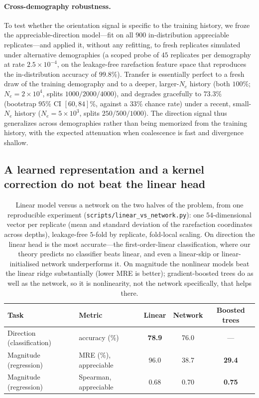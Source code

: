 \documentclass[11pt]{article}
\theoremstyle{plain}
\theoremstyle{definition}
\theoremstyle{remark}
\begin{document}
\paragraph{Cross-demography robustness.} To test whether the orientation signal is specific to the training
history, we froze the appreciable-direction model---fit on all $900$ in-distribution appreciable
replicates---and applied it, without any refitting, to fresh replicates simulated under alternative
demographies (a scoped probe of $45$ replicates per demography at rate $2.5\times10^{-4}$, on the
leakage-free rarefaction feature space that reproduces the in-distribution accuracy of $99.8\%$). Transfer is
essentially perfect to a fresh draw of the training demography and to a deeper, larger-$N_e$ history (both
$100\%$; $N_e=2\times10^{4}$, splits $1000/2000/4000$), and degrades gracefully to $73.3\%$ (bootstrap $95\%$
CI $[60,84]\%$, against a $33\%$ chance rate) under a recent, small-$N_e$ history ($N_e=5\times10^{3}$, splits
$250/500/1000$). The direction signal thus generalizes across demographies rather than being memorized from
the training history, with the expected attenuation when coalescence is fast and divergence shallow.

\subsection{A learned representation and a kernel correction do not beat the linear head}
\label{subsec:deep-kernel}

\begin{table}[b]
\centering
\begin{tabular}{llccc}
\toprule
Task & Metric & Linear & Network & Boosted trees \\
\midrule
Direction (classification) & accuracy (\%) & \textbf{78.9} & 76.0 & --- \\
Magnitude (regression) & MRE (\%), appreciable & 96.0 & 38.7 & \textbf{29.4} \\
Magnitude (regression) & Spearman, appreciable & 0.68 & 0.70 & \textbf{0.75} \\
\bottomrule
\end{tabular}
\caption{Linear model versus a network on the two halves of the problem, from one reproducible experiment
(\texttt{scripts/linear\_vs\_network.py}): one $54$-dimensional vector per replicate (mean and standard
deviation of the rarefaction coordinates across depths), leakage-free $5$-fold by replicate, fold-local
scaling. On direction the linear head is the most accurate---the first-order-linear classification, where
our theory predicts no classifier beats linear, and even a linear-skip or linear-initialised network
underperforms it. On magnitude the nonlinear models beat the linear ridge substantially (lower MRE is
better); gradient-boosted trees do as well as the network, so it is nonlinearity, not the network
specifically, that helps there.}
\label{tab:lin-vs-net}
\end{table}
\end{document}
